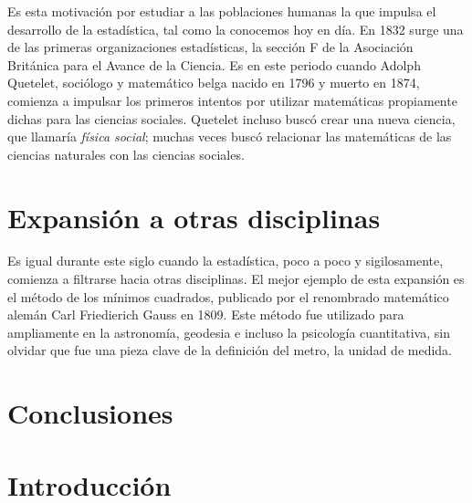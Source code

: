 \documentclass[12pt, a4paper]{article}
\begin{document}
Es esta motivación por estudiar a las poblaciones humanas la que impulsa el desarrollo de la estadística, tal como la conocemos hoy en día. En 1832 surge una de las primeras organizaciones estadísticas, la sección F de la Asociación Británica para el Avance de la Ciencia. Es en este periodo cuando Adolph Quetelet, sociólogo y matemático belga nacido en 1796 y muerto en 1874, comienza a impulsar los primeros intentos por utilizar matemáticas propiamente dichas para las ciencias sociales. Quetelet incluso buscó crear una nueva ciencia, que llamaría \textit{física social}; muchas veces buscó relacionar las matemáticas de las ciencias naturales con las ciencias sociales.

\section{Expansión a otras disciplinas}

Es igual durante este siglo cuando la estadística, poco a poco y sigilosamente, comienza a filtrarse hacia otras disciplinas. El mejor ejemplo de esta expansión es el método de los mínimos cuadrados, publicado por el renombrado matemático alemán Carl Friedierich Gauss en 1809. Este método fue utilizado para ampliamente en la astronomía, geodesia e incluso la psicología cuantitativa, sin olvidar que fue una pieza clave de la definición del metro, la unidad de medida.



\section{Conclusiones}

\section{Introducción}
\end{document}
